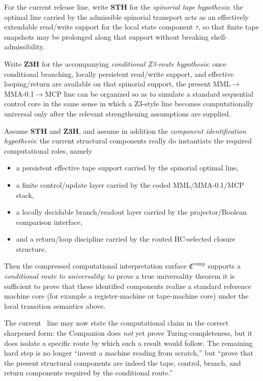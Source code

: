 \begin{definition}
For the current release line, write $\mathbf{STH}$ for the \emph{spinorial tape hypothesis}: the optimal line carried by the admissible spinorial transport acts as an effectively extendable read/write support for the local state component $\tau$, so that finite tape snapshots may be prolonged along that support without breaking shell-admissibility.

Write $\mathbf{Z3H}$ for the accompanying \emph{conditional Z3-route hypothesis}: once conditional branching, locally persistent read/write support, and effective looping/return are available on that spinorial support, the present MML$\to$MMA-0.1$\to$MCP line can be organized so as to simulate a standard sequential control core in the same sense in which a Z3-style line becomes computationally universal only after the relevant strengthening assumptions are supplied.
\end{definition}

\begin{proposition}
Assume $\mathbf{STH}$ and $\mathbf{Z3H}$, and assume in addition the \emph{component identification hypothesis}: the current structural components really do instantiate the required computational roles, namely
\begin{itemize}[leftmargin=2em]
 \item a persistent effective tape support carried by the spinorial optimal line,
 \item a finite control/update layer carried by the coded MML/MMA-0.1/MCP stack,
 \item a locally decidable branch/readout layer carried by the projector/Boolean comparison interface,
 \item and a return/loop discipline carried by the routed HC-selected closure structure.
\end{itemize}
Then the compressed computational interpretation surface $\mathfrak C^{\mathrm{comp}}$ supports a \emph{conditional route to universality}: to prove a true universality theorem it is sufficient to prove that these identified components realize a standard reference machine core (for example a register-machine or tape-machine core) under the local transition semantics above.
\end{proposition}

\begin{corollary}
The current \docversion\ line may now state the computational claim in the correct sharpened form: the Companion does \emph{not} yet prove Turing-completeness, but it does isolate a specific route by which such a result would follow. The remaining hard step is no longer ``invent a machine reading from scratch,'' but ``prove that the present structural components are indeed the tape, control, branch, and return components required by the conditional route.''
\end{corollary}


